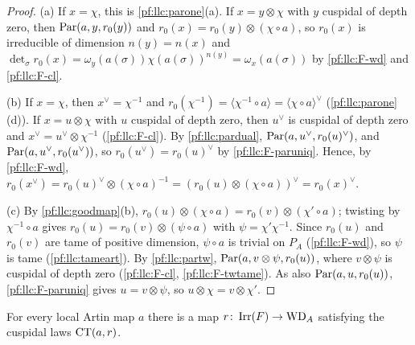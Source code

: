 \begin{proof}
(a) If $x=\chi$, this is \cref{pf:llc:parone}(a). If $x=y\otimes\chi$ with $y$ cuspidal of depth zero, then
$\operatorname{Par}(a,y,r_0(y))$ and $r_0(x)=r_0(y)\otimes(\chi\circ a)$, so $r_0(x)$ is irreducible of dimension $n(y)=n(x)$ and
$\det_\sigma r_0(x)=\omega_y(a(\sigma))\chi(a(\sigma))^{n(y)}=\omega_x(a(\sigma))$ by \ref{pf:llc:F-wd} and \ref{pf:llc:F-cl}.

(b) If $x=\chi$, then $x^\vee=\chi^{-1}$ and $r_0(\chi^{-1})=\langle\chi^{-1}\circ a\rangle=\langle\chi\circ a\rangle^\vee$
(\cref{pf:llc:parone}(d)). If $x=u\otimes\chi$ with $u$ cuspidal of depth zero, then $u^\vee$ is cuspidal of depth zero and
$x^\vee=u^\vee\otimes\chi^{-1}$ (\ref{pf:llc:F-cl}). By \cref{pf:llc:pardual}, $\operatorname{Par}(a,u^\vee,r_0(u)^\vee)$, and
$\operatorname{Par}(a,u^\vee,r_0(u^\vee))$, so $r_0(u^\vee)=r_0(u)^\vee$ by \ref{pf:llc:F-paruniq}. Hence, by \ref{pf:llc:F-wd},
$r_0(x^\vee)=r_0(u)^\vee\otimes(\chi\circ a)^{-1}=(r_0(u)\otimes(\chi\circ a))^\vee=r_0(x)^\vee$.

(c) By \cref{pf:llc:goodmap}(b), $r_0(u)\otimes(\chi\circ a)=r_0(v)\otimes(\chi'\circ a)$; twisting by $\chi^{-1}\circ a$ gives
$r_0(u)=r_0(v)\otimes(\psi\circ a)$ with $\psi=\chi'\chi^{-1}$. Since $r_0(u)$ and $r_0(v)$ are tame of positive dimension,
$\psi\circ a$ is trivial on $P_A$ (\ref{pf:llc:F-wd}), so $\psi$ is tame (\cref{pf:llc:tameart}). By \cref{pf:llc:partw},
$\operatorname{Par}(a,v\otimes\psi,r_0(u))$, where $v\otimes\psi$ is cuspidal of depth zero (\ref{pf:llc:F-cl}, \ref{pf:llc:F-twtame}).
As also $\operatorname{Par}(a,u,r_0(u))$, \ref{pf:llc:F-paruniq} gives $u=v\otimes\psi$, so $u\otimes\chi=v\otimes\chi'$.
\end{proof}

\begin{theorem}\label{pf:llc:cuspex}
For every local Artin map $a$ there is a map $r\colon\operatorname{Irr}(F)\to\mathrm{WD}_A$ satisfying the cuspidal laws $\operatorname{CT}(a,r)$.
\end{theorem}

